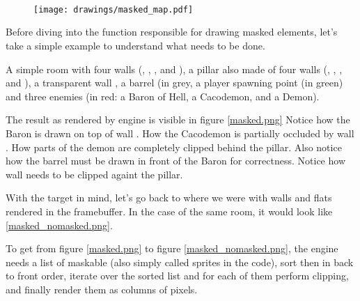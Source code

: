 \\

\\

\\

\pagebreak






\begin{figure}
\centering
\texttt{[image: drawings/masked\_map.pdf]}
\end{figure}

Before diving into the function responsible for drawing masked elements, let's take a simple example to understand what needs to be done.\\
\par
 A simple room with four walls (, , , and ), a pillar also made of four walls (, , , and ), a transparent wall , a barrel (in grey, a player spawning point (in green) and three enemies (in red: a Baron of Hell, a Cacodemon, and a Demon).\\
\par
The result as rendered by \doom engine is visible in figure \ref{masked.png} Notice how the Baron is drawn on top of wall . How the Cacodemon is partially occluded by wall . How parts of the demon are completely clipped behind the pillar. Also notice how the barrel must be drawn in front of the Baron for correctness. Notice how wall  needs to be clipped againt the pillar.\\
\par
{}
\par
With the target in mind, let's go back to where we were with walls and flats rendered in the framebuffer. In the case of the same room, it would look like \ref{masked_nomasked.png}.\\
\par
{}
\par
To get from figure \ref{masked.png} to figure \ref{masked_nomasked.png}, the engine needs a list of maskable (also simply called sprites in the code), sort then in back to front order, iterate over the sorted list and for each of them perform clipping, and finally render them as columns of pixels.\\
\par
